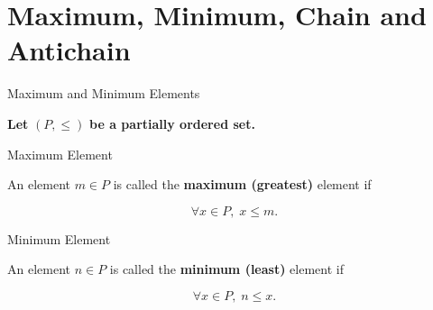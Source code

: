 \section{Maximum, Minimum, Chain and Antichain}

\begin{frame}{Maximum and Minimum Elements}

\textbf{Let } $(P,\leq)$ \textbf{ be a partially ordered set.}

\vspace{0.5cm}

\begin{block}{Maximum Element}

\vspace{0.1cm}

An element $m\in P$ is called the \textbf{maximum (greatest)} element if

\[
\forall x\in P,\; x\leq m.
\]

\end{block}

\vspace{0.4cm}

\begin{block}{Minimum Element}

\vspace{0.1cm}

An element $n\in P$ is called the \textbf{minimum (least)} element if

\[
\forall x\in P,\; n\leq x.
\]

\end{block}

\end{frame}


